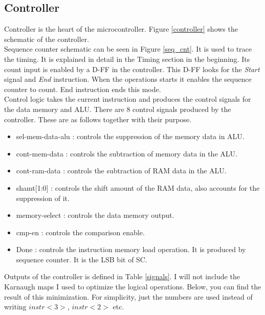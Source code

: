 \documentclass[12pt]{article}
\begin{document}
\subsection*{Controller}


Controller is the heart of the microcontroller. Figure \ref{controller} shows the schematic of the controller.\\

Sequence counter schematic can be seen in Figure \ref{seq_cnt}. It is used to trace the timing. It is explained in detail in the Timing section in the beginning. Its count input is enabled by a D-FF in the controller. This D-FF looks for the \textsl{Start} signal and \textsl{End} instruction. When the operations starts it enables the sequence counter to count. End instruction ends this mode.\\

Control logic takes the current instruction and produces the control signals for the data memory and ALU. There are 8 control signals produced by the controller. These are as follows together with their purpose.
\begin{itemize}
\item sel-mem-data-alu : controls the suppression of the memory data in ALU.
\item cont-mem-data : controls the subtraction of memory data in the ALU. 
\item cont-ram-data : controls the subtraction of RAM data in the ALU.
\item shamt[1:0] : controls the shift amount of the RAM data, also accounts for the suppression of it.
\item memory-select : controls the data  memory output.
\item cmp-en : controls the comparison enable.
\item Done : controls the instruction memory load operation. It is produced by sequence counter. It is the LSB bit of SC.
\end{itemize} 

Outputs of the controller is defined in Table \ref{signals}. I will not include the Karnaugh maps I used to optimize the logical operations. Below, you can find the result of this minimization. For simplicity, just the numbers are used instead of writing $instr<3>$, $instr<2>$ etc.
\end{document}
